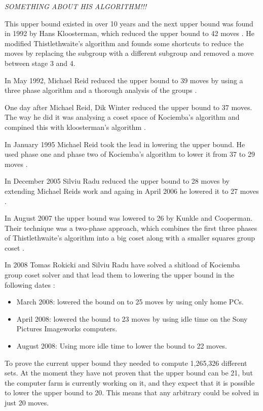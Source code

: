 \emph{SOMETHING ABOUT HIS ALGORITHM!!!}

This upper bound existed in over 10 years and the next upper bound was found in 1992 by Hans Kloosterman, which reduced the upper bound to 42 moves \cite[p. 44]{rokickipdf}. 
He modified Thistlethwaite's algorithm and founds some shortcuts to reduce the moves by replacing the  subgroup with a different subgroup and removed a move between stage 3 and 4.

In May 1992, Michael Reid reduced the upper bound to 39 moves by using a three phase algorithm and a thorough analysis of the groups \cite[p. 52]{rokickipdf}.

One day after Michael Reid, Dik Winter reduced the upper bound to 37 moves. The way he did it was analysing a coset space of Kociemba's algorithm and compined this with kloosterman's algorithm \cite[p. 53]{rokickipdf}.

In January 1995 Michael Reid took the lead in lowering the upper bound. He used phase one and phase two of Kociemba's algorithm to lower it from 37 to 29 moves \cite[p. 55]{rokickipdf}.

In December 2005 Silviu Radu reduced the upper bound to 28 moves by extending Michael Reids work and againg in April 2006 he lowered it to 27 moves \cite[p. 58]{rokickipdf}.

In August 2007 the upper bound was lowered to 26 by Kunkle and Cooperman. Their technique was a two-phase approach, which combines the first three phases of Thistlethwaite's algorithm into a big coset along with a smaller squares group coset \cite[p. 63]{rokickipdf}.

In 2008 Tomas Rokicki and Silviu Radu have solved a shitload of Kociemba group coset solver and that lead them to lowering the upper bound in the following dates \cite[p. 66]{rokickipdf}:
\begin{itemize}
\item March 2008: lowered the bound on to 25 moves by using only home PCs.
\item April 2008: lowered the bound to 23 moves by using idle time on the Sony Pictures Imageworks computers.
\item August 2008: Using more idle time to lower the bound to 22 moves.
\end{itemize}

\begin{comment}
The progression greatly accelerated when that set solver proved the first upper bound of 25 moves. This was done on home computers from October 2007 to March 2008. They only needed to solve 6000 sets, but after this they got contacted by John Welborn from Sony Pictures Imageworks and he offered a lot of idle computers from a computer farm to help on the project. 
\end{comment}

To prove the current upper bound they needed to compute 1,265,326 different sets. At the moment they have not proven that the upper bound can be 21, but the computer farm is currently working on it, and they expect that it is possible to lower the upper bound to 20. This means that any arbitrary \rubik{} could be solved in just 20 moves.
